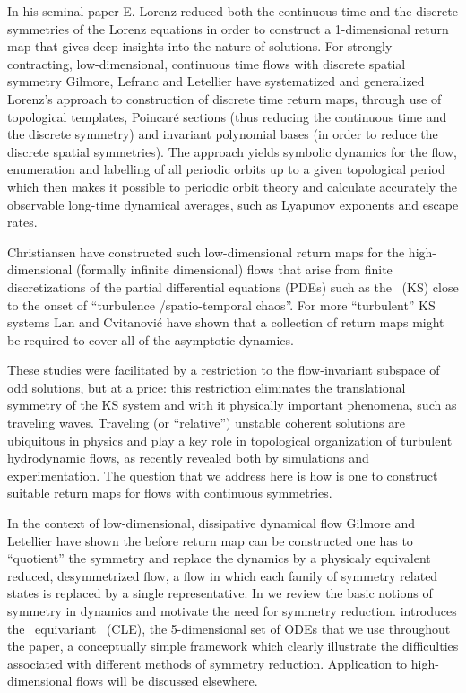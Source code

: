 %
In his seminal paper E. Lorenz reduced both
the continuous time and the discrete symmetries of the
Lorenz equations in order to construct a 1-dimensional 
return map that gives deep insights into the nature of solutions.
For strongly contracting, low-dimensional, continuous time
flows with discrete spatial symmetry
Gilmore, Lefranc and Letellier
have systematized and generalized 
Lorenz's approach to construction of discrete time return maps, through 
use of topological templates, Poincar\'e sections (thus
reducing the continuous time and the discrete symmetry)
and invariant polynomial bases (in order to reduce the
discrete spatial symmetries).
The approach yields symbolic dynamics for the flow,
enumeration and labelling of all periodic orbits up to a given 
topological period which then makes it possible to 
periodic orbit theory and calculate accurately
the observable long-time dynamical averages, such as Lyapunov exponents 
and escape rates.

Christiansen \etal{} have constructed such 
low-dimensional return maps for the
high-dimensional (formally
infinite dimensional)  flows that arise from finite discretizations
of the  partial differential equations (PDEs) such as the
\KSe\ (KS) close to the 
onset of ``turbulence /spatio-temporal chaos''.
For more ``turbulent'' KS systems Lan and Cvitanovi\'{c}
have shown that a collection of return maps might
be required to cover all of the asymptotic dynamics.

These studies were facilitated by a restriction to the flow-invariant 
subspace of odd solutions, but at a price: this restriction eliminates the translational 
symmetry of the KS system and with it physically important phenomena, such as
traveling waves. Traveling (or ``relative'') unstable
coherent solutions are ubiquitous in physics and 
play a key role in topological organization of turbulent hydrodynamic flows,
as recently revealed both by simulations 
and experimentation.
The question that we address here is how is one to construct suitable return maps
for flows with continuous symmetries.

In the context of low-dimensional, dissipative dynamical flow 
Gilmore and Letellier have shown the before return
map can be constructed one has to ``quotient'' the symmetry and
replace the dynamics by a physicaly equivalent 
reduced, desymmetrized flow, a flow in which each family of symmetry related states
is replaced by a single representative. 
In  we
review the basic notions of symmetry in dynamics 
and motivate the need for symmetry 
reduction.
 introduces the \ equivariant
 \cLe\ (CLE),
the 5-dimensional set of ODEs that we use throughout the paper,
a conceptually  simple framework which clearly
illustrate the difficulties associated with  different
methods of symmetry reduction.
Application to high-dimensional flows will
be discussed elsewhere.

